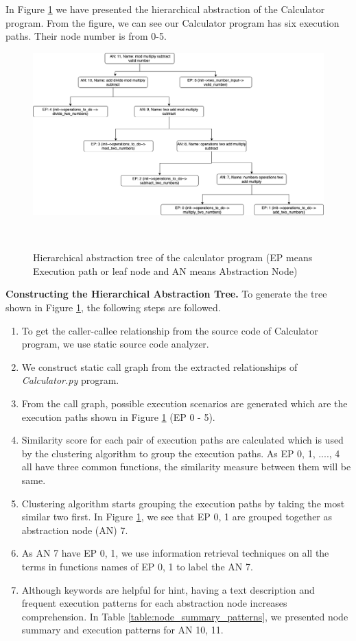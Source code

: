In Figure \ref{fig:motivation} we have presented the hierarchical abstraction of the Calculator program. From the figure, we can see our Calculator program has six execution paths. Their node number is from 0-5. 

\begin{figure}[h]
  \centering
  \includegraphics[width=\columnwidth]{figures/hla2/hla2_motivation.png}
  \caption{Hierarchical abstraction tree of the calculator program (EP means Execution path or leaf node and AN means Abstraction Node)}~\label{fig:motivation}
\end{figure}

\textbf{Constructing the Hierarchical Abstraction Tree.} To generate the tree shown in Figure \ref{fig:motivation}, the following steps are followed.

\begin{enumerate}
    \item To get the caller-callee relationship from the source code of Calculator program, we use static source code analyzer.
    \item We construct static call graph from the extracted relationships of \emph{Calculator.py} program. 
    \item From the call graph, possible execution scenarios are generated  which are the execution paths shown in Figure \ref{fig:motivation} (EP 0 - 5).
    \item Similarity score for each pair of execution paths are calculated which is used by the clustering algorithm to group the execution paths. As EP 0, 1, ...., 4 all have three common functions, the similarity measure between them  will be same.  
    \item Clustering algorithm starts grouping the execution paths by taking the most similar two first. In Figure \ref{fig:motivation}, we see that EP 0, 1 are grouped together as abstraction node (AN) 7.
    \item As AN 7 have EP 0, 1, we use information retrieval techniques on all the terms in functions names of EP 0, 1 to label the AN 7. 
    \item Although keywords are helpful for hint, having a text description and frequent execution patterns for each abstraction node increases comprehension. In Table \ref{table:node_summary_patterns}, we presented node summary and execution patterns for AN 10, 11. 
    
\end{enumerate}



